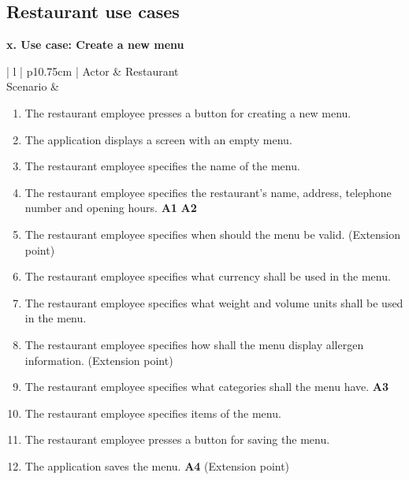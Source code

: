 \subsection{Restaurant use cases}

\noindent \textbf{x. Use case: Create a new menu}
\begin{center}
  \begin{tabular}{| l | p{10.75cm} | }
    \hline
    Actor        & Restaurant \\
    \hline
    Scenario     &
    \begin{minipage}[t]{\linewidth}
      \begin{enumerate}[leftmargin=*,nosep,before=\vspace{-0.575\baselineskip},after=\strut]
        \item The restaurant employee presses a button for creating a new menu.
        \item The application displays a screen with an empty menu.
        \item The restaurant employee specifies the name of the menu.
        \item The restaurant employee specifies the restaurant's name, address, telephone number and opening hours. \textbf{A1} \textbf{A2} 
        \item The restaurant employee specifies when should the menu be valid. (Extension point)
        \item The restaurant employee specifies what currency shall be used in the menu.
        \item The restaurant employee specifies what weight and volume units shall be used in the menu.
        \item The restaurant employee specifies how shall the menu display allergen information. (Extension point) 
        \item The restaurant employee specifies what categories shall the menu have. \textbf{A3}
        \item The restaurant employee specifies items of the menu.
        \item The restaurant employee presses a button for saving the menu.
        \item The application saves the menu. \textbf{A4} (Extension point)
      \end{enumerate}
    \end{minipage}

\end{tabular}
\end{center}
